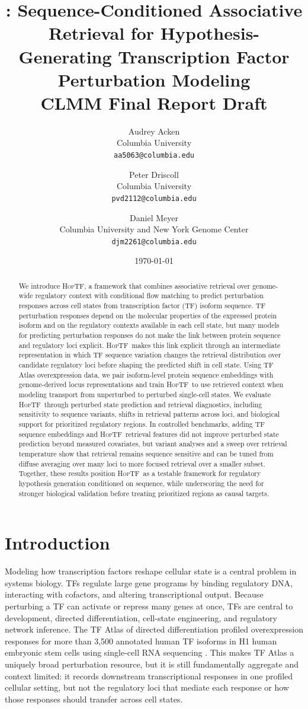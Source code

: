 \documentclass[11pt]{article}
\title{\vspace{-1.0em}\textbf{\hoptf: Sequence-Conditioned Associative Retrieval for Hypothesis-Generating Transcription Factor Perturbation Modeling}\\[-0.15em]
\large CLMM Final Report Draft}
\author{
Audrey Acken\\Columbia University\\\texttt{aa5063@columbia.edu}
\and
Peter Driscoll\\Columbia University\\\texttt{pvd2112@columbia.edu}
\and
Daniel Meyer\\Columbia University and New York Genome Center\\\texttt{djm2261@columbia.edu}
}
\date{\today}
\newcommand{\hoptf}{\textsc{HopTF}}
\begin{document}
\maketitle

\begin{abstract}
We introduce \hoptf, a framework that combines associative retrieval over genome-wide regulatory context with conditional flow matching to predict perturbation responses across cell states from transcription factor (TF) isoform sequence. TF perturbation responses depend on the molecular properties of the expressed protein isoform and on the regulatory contexts available in each cell state, but many models for predicting perturbation responses do not make the link between protein sequence and regulatory loci explicit. \hoptf\ makes this link explicit through an intermediate representation in which TF sequence variation changes the retrieval distribution over candidate regulatory loci before shaping the predicted shift in cell state. Using TF Atlas overexpression data, we pair isoform-level protein sequence embeddings with genome-derived locus representations and train \hoptf\ to use retrieved context when modeling transport from unperturbed to perturbed single-cell states. We evaluate \hoptf\ through perturbed state prediction and retrieval diagnostics, including sensitivity to sequence variants, shifts in retrieval patterns across loci, and biological support for prioritized regulatory regions. In controlled benchmarks, adding TF sequence embeddings and \hoptf\ retrieval features did not improve perturbed state prediction beyond measured covariates, but variant analyses and a sweep over retrieval temperature show that retrieval remains sequence sensitive and can be tuned from diffuse averaging over many loci to more focused retrieval over a smaller subset. Together, these results position \hoptf\ as a testable framework for regulatory hypothesis generation conditioned on sequence, while underscoring the need for stronger biological validation before treating prioritized regions as causal targets.
\end{abstract}

\section{Introduction}

Modeling how transcription factors reshape cellular state is a central problem in systems biology. TFs regulate large gene programs by binding regulatory DNA, interacting with cofactors, and altering transcriptional output. Because perturbing a TF can activate or repress many genes at once, TFs are central to development, directed differentiation, cell-state engineering, and regulatory network inference. The TF Atlas of directed differentiation profiled overexpression responses for more than 3,500 annotated human TF isoforms in H1 human embryonic stem cells using single-cell RNA sequencing \citep{joung2023}. This makes TF Atlas a uniquely broad perturbation resource, but it is still fundamentally aggregate and context limited: it records downstream transcriptional responses in one profiled cellular setting, but not the regulatory loci that mediate each response or how those responses should transfer across cell states.
\end{document}
